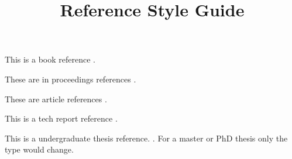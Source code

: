\documentclass[12pt,a4paper]{article}
\begin{document}
\title{Reference Style Guide}
\maketitle

This is a book reference \cite{Proakis2008}. 

These are in proceedings references \cite{Chaves2017,Luo2014}.

These are article references \cite{Belfiore1979,Cioffi1995}. 

This is a tech report reference \cite{Schmidt2011}.

This is a undergraduate thesis reference. \cite{Chaves2016}. For a master or PhD thesis	 only the type would change.




	
\end{document}

